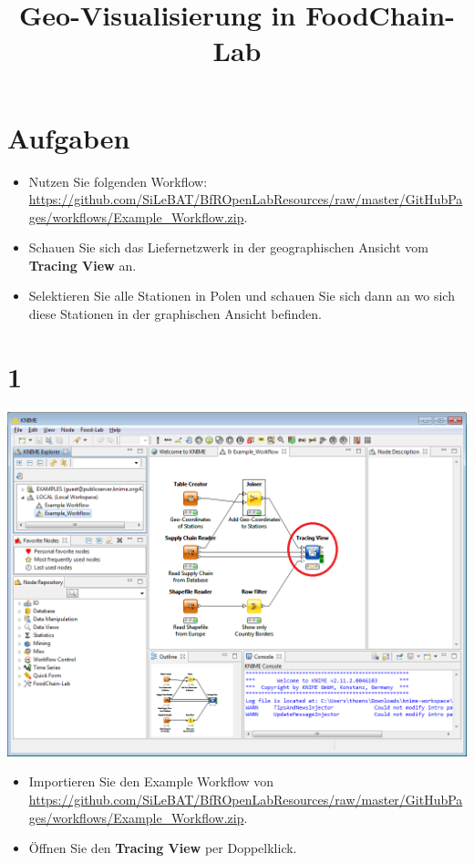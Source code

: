 \documentclass{beamer}
\title{Geo-Visualisierung in FoodChain-Lab}
\date{}
\begin{document}
\maketitle

\section{Aufgaben}
\begin{frame}
	\begin{itemize}
		\item Nutzen Sie folgenden Workflow: \url{https://github.com/SiLeBAT/BfROpenLabResources/raw/master/GitHubPages/workflows/Example_Workflow.zip}.
		\item Schauen Sie sich das Liefernetzwerk in der geographischen Ansicht vom \textbf{Tracing View} an.
		\item Selektieren Sie alle Stationen in Polen und schauen Sie sich dann an wo sich diese Stationen in der graphischen Ansicht befinden.
	\end{itemize}
\end{frame}
 
\section{1}
\begin{frame}
	\begin{center}
  		\includegraphics[height=0.6\textheight]{1.png}
	\end{center}
	\begin{itemize}
		\item Importieren Sie den Example Workflow von \url{https://github.com/SiLeBAT/BfROpenLabResources/raw/master/GitHubPages/workflows/Example_Workflow.zip}.
		\item Öffnen Sie den \textbf{Tracing View} per Doppelklick.
	\end{itemize}
\end{frame}
\end{document}
